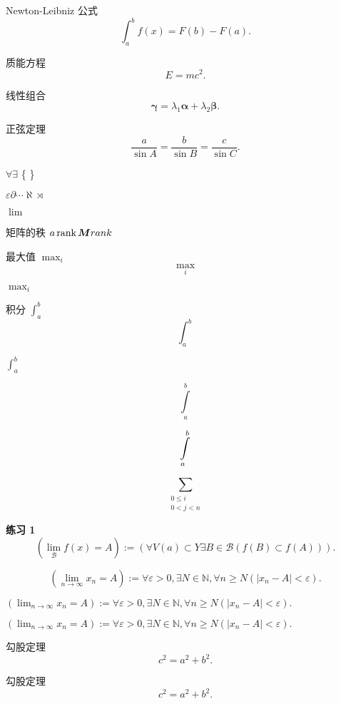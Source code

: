 \documentclass[UTF8, a4paper, 12pt, oneside, onecolumn]{article}
\begin{document}
Newton-Leibniz 公式
\begin{equation}
	\int_a^b f(x) = F(b) - F(a).
\end{equation}

质能方程
$$E = mc^2.$$

线性组合
\[\bm\gamma = \lambda_1\bm\alpha + \lambda_2\bm\beta.\]	%

正弦定理
\begin{displaymath}
\dfrac{a}{\sin A} = \dfrac{b}{\sin B} = \dfrac{c}{\sin C}.
\end{displaymath}

$\forall\exists$
\{ \}

$\varepsilon \partial \cdots \aleph \rtimes$	%

$\lim$

矩阵的秩 $a\operatorname{rank}\bm{M} rank$

\begin{center}
最大值 $\max_{i}$	\[\max_{i}\]

$\displaystyle\max_{i}$

积分 $\int_a^b$	\[\int_a^b\]

$\displaystyle\int_a^b$

\[\int\limits_a^b\]

\[\intop_a^b\]
\end{center}

\[\sum_{\substack{0 \leq i\\ 0 < j < n}}\]

{\bf 练习 1}
\[(\lim_{\mathcal{B}}f(x) = A) := (\forall V(a) \subset Y \exists B \in \mathcal{B}(f(B) \subset f(A))).\]

$$(\lim_{n \to \infty} x_n = A) := \forall \varepsilon > 0, \exists N \in \mathbb{N}, \forall n \geqslant N(|x_n - A| < \varepsilon).$$

$(\lim_{n \to \infty} x_n = A) := \forall \varepsilon > 0, \exists N \in \mathbb{N}, \forall n \geqslant N(|x_n - A| < \varepsilon).$

$(\displaystyle\lim_{n \to \infty} x_n = A) := \forall \varepsilon > 0, \exists N \in \mathbb{N}, \forall n \geqslant N(|x_n - A| < \varepsilon).$

勾股定理\begin{equation}
c^2 = a^2 + b^2.
\end{equation}

勾股定理\begin{equation*}
c^2 = a^2 + b^2.
\end{equation*}
\end{document}
